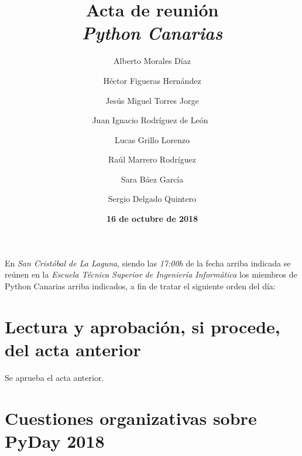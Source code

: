 \documentclass[a4paper, 12pt]{article}
\title{\huge \textbf{Acta de reunión} \\ \textit{Python Canarias}}
\date{\textbf{16 de octubre de 2018}}
\author{
    Alberto Morales Díaz \and
    Héctor Figueras Hernández \and
    Jesús Miguel Torres Jorge \and
    Juan Ignacio Rodríguez de León\ \and 
    Lucas Grillo Lorenzo \and
    Raúl Marrero Rodríguez \and
    Sara Báez García \and
    Sergio Delgado Quintero
}
\begin{document}
\renewcommand{\contentsname}{Orden del día}

\maketitle

En \textit{San Cristóbal de La Laguna}, siendo las \textit{17:00h} de la fecha arriba indicada se reúnen en la \textit{Escuela Técnica Superior de Ingeniería Informática} los miembros de Python Canarias arriba indicados, a fin de tratar el siguiente orden del día:

\tableofcontents

\section{Lectura y aprobación, si procede, del acta anterior}

Se aprueba el acta anterior.

\section{Cuestiones organizativas sobre PyDay 2018}
\end{document}
